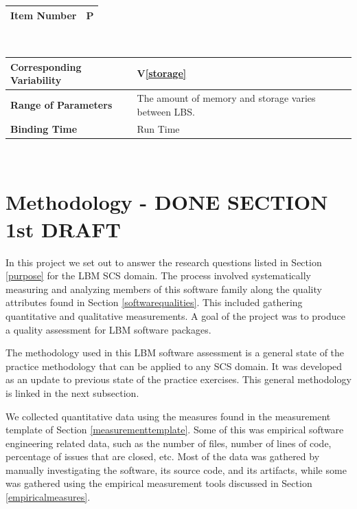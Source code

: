 \documentclass[12pt, notitlepage]{article}
\newcommand{\colEwidth}{0.33\textwidth}
\newcommand{\colFwidth}{0.67\textwidth}
\newcommand{\vref}[1]{V\ref{#1}}
\newcounter{parnum} %
\begin{document}
\begin{minipage}{\textwidth}
	\renewcommand*{\arraystretch}{1.5}
	\begin{tabular}{| p{\colEwidth} | p{\colFwidth}|}
		\hline
		\bf Item Number& P{parnum}\theparnum\label{parstorageconst} \\
		\hline
	\end{tabular}\\
	
	\begin{tabular}{| p{\colEwidth} | p{\colFwidth}|}		
		\hline
		\bf Corresponding Variability & \vref{storage}\\
		\hline
		\bf Range of Parameters & The amount of memory and storage varies between LBS.\\
		\hline
		\bf Binding Time & Run Time\\
		\hline
	\end{tabular}
\end{minipage}\\

\newpage
\section{Methodology - DONE SECTION 1st DRAFT}

In this project we set out to answer the research questions listed in Section \ref{purpose} for the LBM SCS domain. The process involved systematically measuring and analyzing members of this software family along the quality attributes found in Section \ref{softwarequalities}. This included gathering quantitative and qualitative measurements. A goal of the project was to produce a quality assessment for LBM software packages.  

The methodology used in this LBM software assessment is a general state of the practice methodology that can be applied to any SCS domain. It was developed as an update to previous state of the practice exercises. This general methodology is linked in the next subsection.

We collected quantitative data using the measures found in the measurement template of Section \ref{measurementtemplate}. Some of this was empirical software engineering related data, such as the number of files, number of lines of code, percentage of issues that are closed, etc. Most of the data was gathered by manually investigating the software, its source code, and its artifacts, while some was gathered using the empirical measurement tools discussed in Section \ref{empiricalmeasures}.
\end{document}
